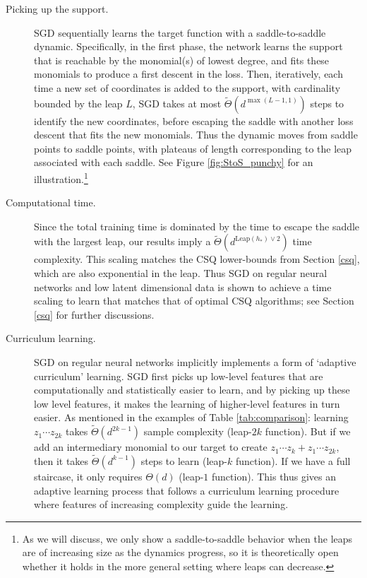 \documentclass[11pt]{article}
\newcommand{\<}{\langle}
\renewcommand{\>}{\rangle}
\theoremstyle{definition}
\def\Leap{\mathrm{Leap}}
\begin{document}
\begin{description}
\item[Picking up the support.] SGD sequentially learns the target function with a saddle-to-saddle dynamic. Specifically, in the first phase, the network learns the support that is reachable by the monomial(s) of lowest degree, and fits these monomials to produce a first descent in the loss. Then, iteratively, each time a new set of coordinates is added to the support, with cardinality bounded by the leap $L$, SGD takes at most $\tilde{\Theta}(d^{\max(L-1,1)})$ steps to identify the new coordinates, before escaping the saddle with another loss descent that fits the new monomials. Thus the dynamic moves from saddle points to saddle points, with plateaus of length corresponding to the leap associated with each saddle. See Figure \ref{fig:StoS_punchy} for an illustration.\footnote{As we will discuss, we only show a saddle-to-saddle behavior when the leaps are of increasing size as the dynamics progress, so it is theoretically open whether it holds in the more general setting where leaps can decrease.} 

\item[Computational time.] Since the total training time is dominated by the time to escape the saddle with the largest leap, our results imply a $\tilde{\Theta} (d^{\Leap(h_*) \vee 2})$ time complexity. This scaling matches the CSQ lower-bounds from Section \ref{csq}, which are also exponential in the leap. Thus SGD on regular neural networks and low latent dimensional data is shown to achieve a time scaling to learn that matches that of optimal CSQ algorithms; see Section \ref{csq} for further discussions.  

\item[Curriculum learning.] SGD on regular neural networks implicitly implements a form of `adaptive curriculum' learning. SGD first picks up low-level features that are computationally and statistically easier to learn, and by picking up these low level features, it makes the learning of higher-level features in turn easier. As mentioned in the examples of Table \ref{tab:comparison}: learning $z_1 \cdots z_{2k}$ takes $\widetilde{\Theta} (d^{2k-1})$ sample complexity (leap-$2k$ function). But if we add an intermediary monomial to our target to create $z_1 \cdots z_k + z_1 \cdots z_{2k}$,  then it takes $\widetilde{\Theta} (d^{k-1}) $ steps to learn (leap-$k$ function). If we have a full staircase, it only requires $\Theta(d)$ (leap-$1$ function). This thus gives an adaptive learning process that follows a curriculum learning procedure where features of increasing complexity guide the learning. 
\end{description}
\end{document}
